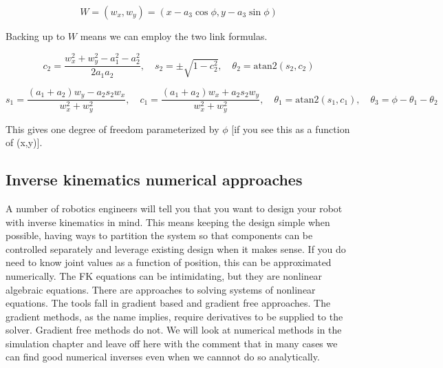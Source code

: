 \[W = (w_x, w_y) = (x - a_3\cos\phi , y - a_3\sin\phi)\]

Backing up to \(W\) means we can employ the two link formulas.

\[c_2 = \frac{w_x^2 + w_y^2 - a_1^2 - a_2^2}{2a_1a_2} , \quad s_2  = \pm \sqrt{1 - c_2^2}, \quad
\theta_2 = \mbox{atan2}(s_2,c_2)\]

\[s_1 = \frac{(a_1+a_2)w_y - a_2s_2w_x}{w_x^2+w_y^2}, \quad c_1 = \frac{(a_1+a_2)w_x + a_2s_2w_y}{w_x^2+w_y^2}, \quad
\theta_1 = \mbox{atan2}(s_1, c_1), \quad \theta_3 = \phi - \theta_1 - \theta_2\]

This gives one degree of freedom parameterized by \(\phi\) {[}if you see
this as a function of (x,y){]}.

\hypertarget{numerica-inverse-kinematics-1}{%
\subsection{Inverse kinematics numerical
approaches}\label{numerica-inverse-kinematics-1}}

A number of robotics engineers will tell you that you want to design
your robot with inverse kinematics in mind. This means keeping the
design simple when possible, having ways to partition the system so that
components can be controlled separately and leverage existing design
when it makes sense. If you do need to know joint values as a function
of position, this can be approximated numerically. The FK equations can
be intimidating, but they are nonlinear algebraic equations. There are
approaches to solving systems of nonlinear equations. The tools fall in
gradient based and gradient free approaches. The gradient methods, as
the name implies, require derivatives to be supplied to the solver.
Gradient free methods do not. We will look at numerical methods in the
simulation chapter and leave off here with the comment that in many
cases we can find good numerical inverses even when we cannnot do so
analytically.
